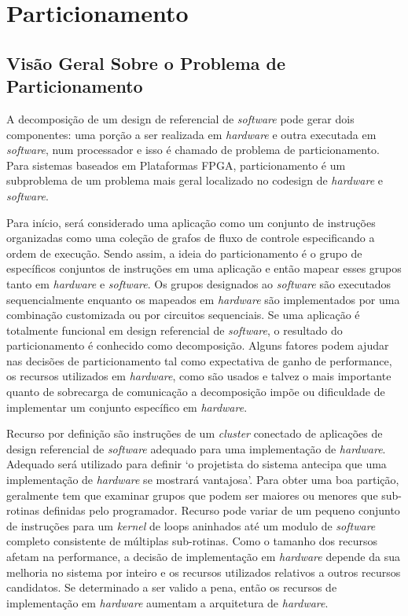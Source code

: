 \chapter{Particionamento}



\section{Visão Geral Sobre o Problema de Particionamento}

A decomposição de um design de referencial de \textit{\textit{software}} pode gerar dois componentes: uma porção a ser realizada em \textit{hardware} e outra executada em \textit{software}, num processador e isso é chamado de problema de particionamento. Para sistemas baseados em Plataformas FPGA, particionamento é um subproblema de um problema mais geral localizado no codesign de \textit{hardware} e \textit{software}. 

Para início, será considerado uma aplicação como um conjunto de instruções organizadas como uma coleção de grafos de fluxo de controle especificando a ordem de execução. Sendo assim, a ideia do particionamento é o grupo de específicos conjuntos de instruções em uma aplicação e então mapear esses grupos tanto em \textit{hardware} e \textit{software}. Os grupos designados ao \textit{software} são executados sequencialmente enquanto os mapeados em \textit{hardware} são implementados por uma combinação customizada ou por circuitos sequenciais. Se uma aplicação é totalmente funcional em design referencial de \textit{software}, o resultado do particionamento é conhecido como decomposição. Alguns fatores podem ajudar nas decisões de particionamento tal como expectativa de ganho de performance, os recursos utilizados em \textit{hardware}, como são usados e talvez o mais importante quanto de sobrecarga de comunicação a decomposição impõe ou dificuldade de implementar um conjunto específico em \textit{hardware}.

Recurso por definição são instruções de um \textit{cluster} conectado de aplicações de design referencial de \textit{software} adequado para uma implementação de \textit{hardware}. Adequado será utilizado para definir `o projetista do sistema antecipa que uma implementação de \textit{hardware} se mostrará vantajosa’. Para obter uma boa partição, geralmente tem que examinar grupos que podem ser maiores ou menores que sub-rotinas definidas pelo programador. Recurso pode variar de um pequeno conjunto de instruções para um \textit{kernel} de loops aninhados até um modulo de \textit{software} completo consistente de múltiplas sub-rotinas. Como o tamanho dos recursos afetam na performance, a decisão de implementação em \textit{hardware} depende da sua melhoria no sistema por inteiro e os recursos utilizados relativos a outros recursos candidatos. Se determinado a ser valido a pena, então os recursos de implementação em \textit{hardware} aumentam a arquitetura de \textit{hardware}. 

